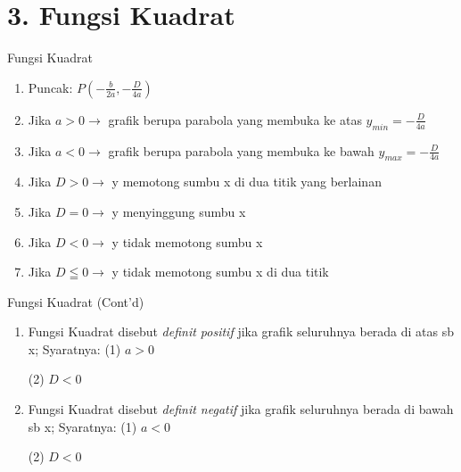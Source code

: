\documentclass{beamer}
\newcounter{saveenumi}
\newcommand{\seti}{\setcounter{saveenumi}{\value{enumi}}}
\newcommand{\conti}{\setcounter{enumi}{\value{saveenumi}}}
\begin{document}
\section{3. Fungsi Kuadrat}
\begin{frame}[t,fragile]{Fungsi Kuadrat}
\center {}
\newline
\begin{enumerate}

\item Puncak: $P(- \frac{b}{2a}, - \frac{D}{4a})$
\hfill
\item Jika $a > 0 \rightarrow$ grafik berupa parabola yang membuka ke atas
      $y_{min} = - \frac{D} {4a}$
\item Jika $a < 0 \rightarrow$ grafik berupa parabola yang membuka ke bawah
      $y_{max} = - \frac{D}{4a}$
\item Jika $D > 0 \rightarrow$ y memotong sumbu x di dua titik yang berlainan
\item Jika $D = 0 \rightarrow$ y menyinggung sumbu x
\item Jika $D < 0 \rightarrow$ y tidak memotong sumbu x
\item Jika $D \leqq 0 \rightarrow$ y tidak memotong sumbu x di dua titik
    \seti
\end{enumerate}
\end{frame}


\begin{frame}[t] {Fungsi Kuadrat (Cont'd)}
\begin{enumerate}
\conti
\item Fungsi Kuadrat disebut \emph{definit positif} jika grafik seluruhnya berada 
      di atas sb x; Syaratnya: \hspace{0.05in}           (1) $a > 0$
                            
      \hspace{1.62in}          (2) $D <0$
\hfill
\item Fungsi Kuadrat disebut \emph{definit negatif} jika grafik seluruhnya berada 
      di bawah sb x; Syaratnya: \hspace{0.05in}           (1) $a < 0$
                            
      \hspace{1.76in}          (2) $D < 0$
\end{enumerate}
\end {frame}
\end{document}

